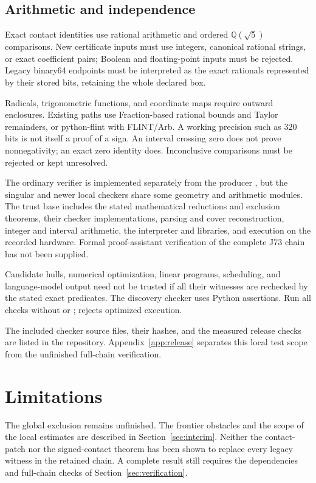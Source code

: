 \documentclass[11pt]{amsart}
\newcommand{\Q}{\mathbb Q}
\newcommand{\file}[1]{\path{#1}}
\theoremstyle{definition}
\theoremstyle{remark}
\begin{document}
\subsection{Arithmetic and independence}
Exact contact identities use rational arithmetic and ordered
$\Q(\sqrt5)$ comparisons. New certificate inputs must use integers,
canonical rational strings, or exact coefficient pairs; Boolean and
floating-point inputs must be rejected. Legacy binary64 endpoints must
be interpreted as the
exact rationals represented by their stored bits, retaining the whole
declared box.

Radicals, trigonometric functions, and coordinate maps require outward
enclosures. Existing paths use Fraction-based rational bounds and
Taylor remainders, or python-flint with FLINT/Arb. A working precision
such as 320 bits is not itself a proof of a sign. An interval crossing
zero does not prove nonnegativity; an exact zero identity does.
Inconclusive comparisons must be rejected or kept unresolved.

The ordinary verifier is implemented separately from the producer
\cite{verifier}, but the singular and newer local checkers share some
geometry and arithmetic modules. The trust base includes the
stated mathematical reductions and exclusion theorems, their checker
implementations, parsing and cover reconstruction, integer and interval
arithmetic, the interpreter and libraries, and execution on the recorded
hardware. Formal proof-assistant verification of the complete J73 chain
has not been supplied.

Candidate hulls, numerical optimization, linear programs, scheduling, and
language-model output need not be trusted if all their witnesses are
rechecked by the stated exact predicates. The discovery checker uses
Python assertions. Run all checks without \file{-O} or
\file{PYTHONOPTIMIZE}; \file{self_test.py} rejects optimized execution.

The included checker source files, their hashes, and the measured release
checks are listed in the repository. Appendix~\ref{app:release} separates
this local test scope from the unfinished full-chain verification.

\section{Limitations}

The global exclusion remains unfinished. The frontier obstacles and the
scope of the local estimates are described in Section~\ref{sec:interim}.
Neither the contact-patch nor the signed-contact theorem has been shown
to replace every legacy witness in the retained chain. A complete result
still requires the dependencies and full-chain checks of
Section~\ref{sec:verification}.
\end{document}
